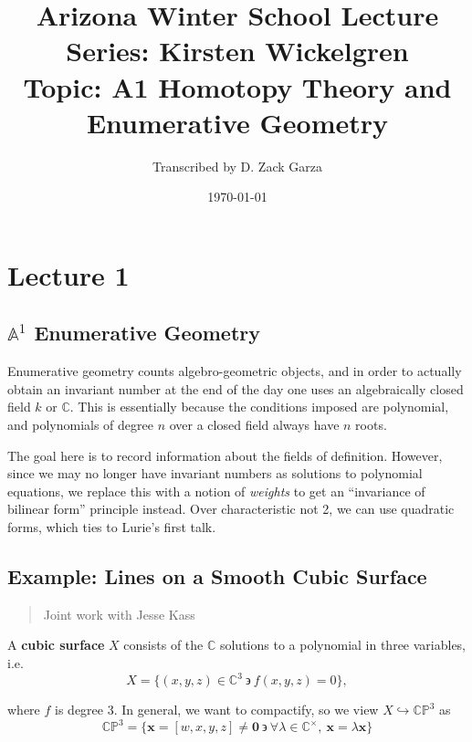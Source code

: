 \documentclass[11pt]{scrreprt}
\title{
	\textbf{Arizona Winter School Lecture Series: Kirsten Wickelgren}\\
	{\normalsize Topic: A1 Homotopy Theory and Enumerative Geometry}
}
\author{Transcribed by D. Zack Garza}
\date{\today}
\theoremstyle{definition}
\newcommand{\CC}[0]{{\mathbb{C}}}
\newcommand{\CP}[0]{{\mathbb{CP}}}
\newcommand{\Af}[0]{{\mathbb{A}}}
\newcommand{\suchthat}[0]{{~\backepsilon ~}}
\newcommand{\theset}[1]{\{{#1}\}}
\newcommand{\injects}[0]{\hookrightarrow}
\renewcommand{\vector}[1]{{\mathbf{ {#1} }}}
\begin{document}
\maketitle

\tableofcontents

\hypertarget{lecture-1}{%
\chapter{Lecture 1}\label{lecture-1}}

\hypertarget{af1-enumerative-geometry}{%
\section{\texorpdfstring{\(\Af^1\) Enumerative
Geometry}{\textbackslash{}Af\^{}1 Enumerative Geometry}}\label{af1-enumerative-geometry}}

Enumerative geometry counts algebro-geometric objects, and in order to
actually obtain an invariant number at the end of the day one uses an
algebraically closed field \(k\) or \(\CC\). This is essentially because
the conditions imposed are polynomial, and polynomials of degree \(n\)
over a closed field always have \(n\) roots.

The goal here is to record information about the fields of definition.
However, since we may no longer have invariant numbers as solutions to
polynomial equations, we replace this with a notion of \emph{weights} to
get an ``invariance of bilinear form'' principle instead. Over
characteristic not 2, we can use quadratic forms, which ties to Lurie's
first talk.

\hypertarget{example-lines-on-a-smooth-cubic-surface}{%
\section{Example: Lines on a Smooth Cubic
Surface}\label{example-lines-on-a-smooth-cubic-surface}}

\begin{quote}
Joint work with Jesse Kass
\end{quote}

A \textbf{cubic surface} \(X\) consists of the \(\CC\) solutions to a
polynomial in three variables, i.e.~ \[
X = \theset{(x,y,z) \in \CC^3 \suchthat f(x,y,z) = 0},
\]

where \(f\) is degree 3. In general, we want to compactify, so we view
\(X \injects \CP^3\) as \[
\CP^3 = \theset{\vector x = [w,x,y,z]\neq \vector 0 \suchthat \forall \lambda \in \CC^\times,~\vector x = \lambda \vector x}
\]
\end{document}
